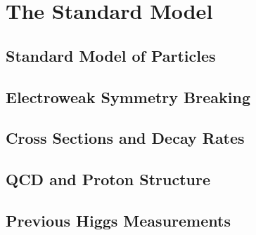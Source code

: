 \chapter{The Standard Model}

\section{Standard Model of Particles}

\section{Electroweak Symmetry Breaking}

\section{Cross Sections and Decay Rates}

\section{QCD and Proton Structure}

\section{Previous Higgs Measurements}



